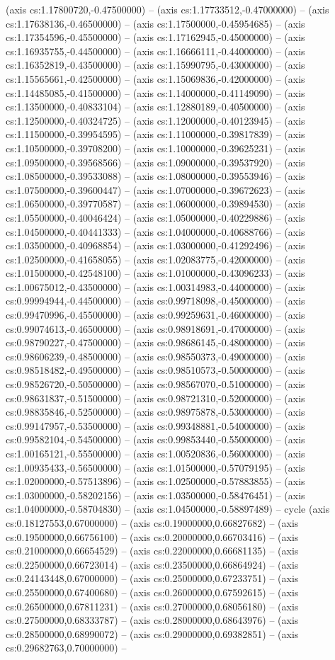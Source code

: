 (axis cs:1.17800720,-0.47500000) -- (axis cs:1.17733512,-0.47000000) -- (axis cs:1.17638136,-0.46500000) -- (axis cs:1.17500000,-0.45954685) -- (axis cs:1.17354596,-0.45500000) -- (axis cs:1.17162945,-0.45000000) -- (axis cs:1.16935755,-0.44500000) -- (axis cs:1.16666111,-0.44000000) -- (axis cs:1.16352819,-0.43500000) -- (axis cs:1.15990795,-0.43000000) -- (axis cs:1.15565661,-0.42500000) -- (axis cs:1.15069836,-0.42000000) -- (axis cs:1.14485085,-0.41500000) -- (axis cs:1.14000000,-0.41149090) -- (axis cs:1.13500000,-0.40833104) -- (axis cs:1.12880189,-0.40500000) -- (axis cs:1.12500000,-0.40324725) -- (axis cs:1.12000000,-0.40123945) -- (axis cs:1.11500000,-0.39954595) -- (axis cs:1.11000000,-0.39817839) -- (axis cs:1.10500000,-0.39708200) -- (axis cs:1.10000000,-0.39625231) -- (axis cs:1.09500000,-0.39568566) -- (axis cs:1.09000000,-0.39537920) -- (axis cs:1.08500000,-0.39533088) -- (axis cs:1.08000000,-0.39553946) -- (axis cs:1.07500000,-0.39600447) -- (axis cs:1.07000000,-0.39672623) -- (axis cs:1.06500000,-0.39770587) -- (axis cs:1.06000000,-0.39894530) -- (axis cs:1.05500000,-0.40046424) -- (axis cs:1.05000000,-0.40229886) -- (axis cs:1.04500000,-0.40441333) -- (axis cs:1.04000000,-0.40688766) -- (axis cs:1.03500000,-0.40968854) -- (axis cs:1.03000000,-0.41292496) -- (axis cs:1.02500000,-0.41658055) -- (axis cs:1.02083775,-0.42000000) -- (axis cs:1.01500000,-0.42548100) -- (axis cs:1.01000000,-0.43096233) -- (axis cs:1.00675012,-0.43500000) -- (axis cs:1.00314983,-0.44000000) -- (axis cs:0.99994944,-0.44500000) -- (axis cs:0.99718098,-0.45000000) -- (axis cs:0.99470996,-0.45500000) -- (axis cs:0.99259631,-0.46000000) -- (axis cs:0.99074613,-0.46500000) -- (axis cs:0.98918691,-0.47000000) -- (axis cs:0.98790227,-0.47500000) -- (axis cs:0.98686145,-0.48000000) -- (axis cs:0.98606239,-0.48500000) -- (axis cs:0.98550373,-0.49000000) -- (axis cs:0.98518482,-0.49500000) -- (axis cs:0.98510573,-0.50000000) -- (axis cs:0.98526720,-0.50500000) -- (axis cs:0.98567070,-0.51000000) -- (axis cs:0.98631837,-0.51500000) -- (axis cs:0.98721310,-0.52000000) -- (axis cs:0.98835846,-0.52500000) -- (axis cs:0.98975878,-0.53000000) -- (axis cs:0.99147957,-0.53500000) -- (axis cs:0.99348881,-0.54000000) -- (axis cs:0.99582104,-0.54500000) -- (axis cs:0.99853440,-0.55000000) -- (axis cs:1.00165121,-0.55500000) -- (axis cs:1.00520836,-0.56000000) -- (axis cs:1.00935433,-0.56500000) -- (axis cs:1.01500000,-0.57079195) -- (axis cs:1.02000000,-0.57513896) -- (axis cs:1.02500000,-0.57883855) -- (axis cs:1.03000000,-0.58202156) -- (axis cs:1.03500000,-0.58476451) -- (axis cs:1.04000000,-0.58704830) -- (axis cs:1.04500000,-0.58897489) -- cycle (axis cs:0.18127553,0.67000000) -- (axis cs:0.19000000,0.66827682) -- (axis cs:0.19500000,0.66756100) -- (axis cs:0.20000000,0.66703416) -- (axis cs:0.21000000,0.66654529) -- (axis cs:0.22000000,0.66681135) -- (axis cs:0.22500000,0.66723014) -- (axis cs:0.23500000,0.66864924) -- (axis cs:0.24143448,0.67000000) -- (axis cs:0.25000000,0.67233751) -- (axis cs:0.25500000,0.67400680) -- (axis cs:0.26000000,0.67592615) -- (axis cs:0.26500000,0.67811231) -- (axis cs:0.27000000,0.68056180) -- (axis cs:0.27500000,0.68333787) -- (axis cs:0.28000000,0.68643976) -- (axis cs:0.28500000,0.68990072) -- (axis cs:0.29000000,0.69382851) -- (axis cs:0.29682763,0.70000000) -- 
